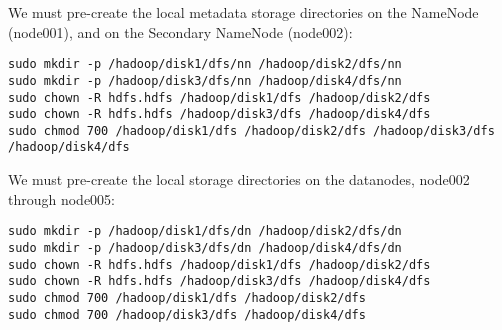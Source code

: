 We must pre-create the local metadata storage directories on the NameNode
(node001), and on the Secondary NameNode (node002):

\begin{verbatim}
sudo mkdir -p /hadoop/disk1/dfs/nn /hadoop/disk2/dfs/nn
sudo mkdir -p /hadoop/disk3/dfs/nn /hadoop/disk4/dfs/nn 
sudo chown -R hdfs.hdfs /hadoop/disk1/dfs /hadoop/disk2/dfs
sudo chown -R hdfs.hdfs /hadoop/disk3/dfs /hadoop/disk4/dfs
sudo chmod 700 /hadoop/disk1/dfs /hadoop/disk2/dfs /hadoop/disk3/dfs /hadoop/disk4/dfs
\end{verbatim}

We must pre-create the local storage directories on the datanodes, node002
through node005:

\begin{verbatim}
sudo mkdir -p /hadoop/disk1/dfs/dn /hadoop/disk2/dfs/dn
sudo mkdir -p /hadoop/disk3/dfs/dn /hadoop/disk4/dfs/dn
sudo chown -R hdfs.hdfs /hadoop/disk1/dfs /hadoop/disk2/dfs
sudo chown -R hdfs.hdfs /hadoop/disk3/dfs /hadoop/disk4/dfs
sudo chmod 700 /hadoop/disk1/dfs /hadoop/disk2/dfs
sudo chmod 700 /hadoop/disk3/dfs /hadoop/disk4/dfs
\end{verbatim}
